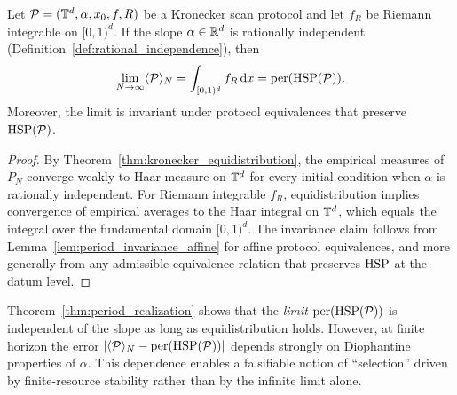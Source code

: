 \begin{theorem}
\label{thm:period_realization}
Let $\mathcal{P}=(\mathbb{T}^d,\alpha,x_0,f,R)$ be a Kronecker scan protocol and let $f_R$ be Riemann integrable on $[0,1)^d$.
If the slope $\alpha\in\mathbb{R}^d$ is rationally independent (Definition~\ref{def:rational_independence}), then
\[
\lim_{N\to\infty}\langle \mathcal{P} \rangle_N = \int_{[0,1)^d} f_R\,\mathrm{d} x
= \mathrm{per}(\mathrm{HSP}(\mathcal{P})).
\]
Moreover, the limit is invariant under protocol equivalences that preserve $\mathrm{HSP}(\mathcal{P})$.
\end{theorem}

\begin{proof}
By Theorem~\ref{thm:kronecker_equidistribution}, the empirical measures of $P_N$ converge weakly to Haar measure on $\mathbb{T}^d$ for every initial condition when $\alpha$ is rationally independent.
For Riemann integrable $f_R$, equidistribution implies convergence of empirical averages to the Haar integral on $\mathbb{T}^d$, which equals the integral over the fundamental domain $[0,1)^d$.
The invariance claim follows from Lemma~\ref{lem:period_invariance_affine} for affine protocol equivalences, and more generally from any admissible equivalence relation that preserves $\mathrm{HSP}$ at the datum level.
\end{proof}

\begin{remark}
\label{rem:finiteN_selection}
Theorem~\ref{thm:period_realization} shows that the \emph{limit} $\mathrm{per}(\mathrm{HSP}(\mathcal{P}))$ is independent of the slope as long as equidistribution holds.
However, at finite horizon the error $\left|\langle \mathcal{P} \rangle_N-\mathrm{per}(\mathrm{HSP}(\mathcal{P}))\right|$ depends strongly on Diophantine properties of $\alpha$.
This dependence enables a falsifiable notion of ``selection'' driven by finite-resource stability rather than by the infinite limit alone.
\end{remark}


